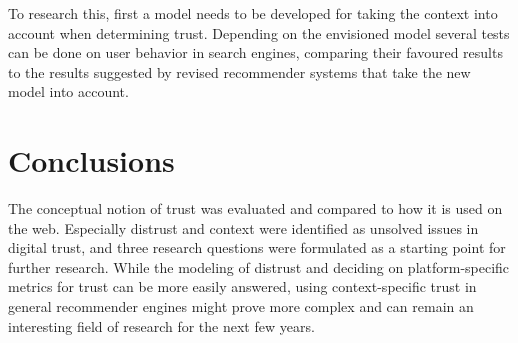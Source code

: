 \documentclass{llncs}
\begin{document}
To research this, first a model needs to be developed for taking the context into account when determining trust. Depending on the envisioned model several tests can be done on user behavior in search engines, comparing their favoured results to the results suggested by revised recommender systems that take the new model into account.


\section{Conclusions}
The conceptual notion of trust was evaluated and compared to how it is used on the web. Especially distrust and context were identified as unsolved issues in digital trust, and three research questions were formulated as a starting point for further research. While the modeling of distrust and deciding on platform-specific metrics for trust can be more easily answered, using context-specific trust in general recommender engines might prove more complex and can remain an interesting field of research for the next few years.


{}
\end{document}
